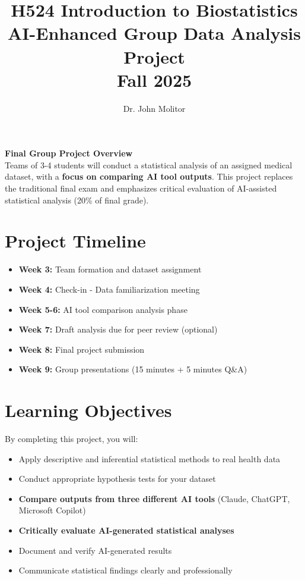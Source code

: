 \documentclass[11pt]{article}
\title{\textbf{H524 Introduction to Biostatistics\\
\Large AI-Enhanced Group Data Analysis Project\\
Fall 2025}}
\author{Dr. John Molitor}
\date{}
\begin{document}
\maketitle

\begin{tcolorbox}[colback=aiblue!10,colframe=aiblue,boxrule=2pt,arc=2pt,left=6pt,right=6pt,top=6pt,bottom=6pt]
\centering
\textbf{\large Final Group Project Overview}\\[0.3em]
Teams of 3-4 students will conduct a statistical analysis of an assigned medical dataset, with a \textbf{focus on comparing AI tool outputs}. This project replaces the traditional final exam and emphasizes critical evaluation of AI-assisted statistical analysis (20\% of final grade).
\end{tcolorbox}

\section{Project Timeline}

\begin{itemize}[leftmargin=20pt]
\item \textbf{Week 3:} Team formation and dataset assignment
\item \textbf{Week 4:} Check-in - Data familiarization meeting
\item \textbf{Week 5-6:} AI tool comparison analysis phase
\item \textbf{Week 7:} Draft analysis due for peer review (optional)
\item \textbf{Week 8:} Final project submission
\item \textbf{Week 9:} Group presentations (15 minutes + 5 minutes Q\&A)
\end{itemize}

\section{Learning Objectives}

By completing this project, you will:
\begin{itemize}[leftmargin=20pt]
\item Apply descriptive and inferential statistical methods to real health data
\item Conduct appropriate hypothesis tests for your dataset
\item \textbf{Compare outputs from three different AI tools} (Claude, ChatGPT, Microsoft Copilot)
\item \textbf{Critically evaluate AI-generated statistical analyses}
\item Document and verify AI-generated results
\item Communicate statistical findings clearly and professionally
\end{itemize}
\end{document}
